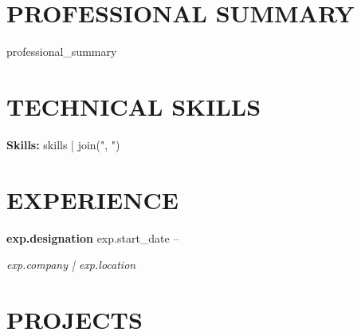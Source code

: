 \documentclass[11pt,a4paper]{article}
\begin{document}
{%

\section*{PROFESSIONAL SUMMARY}

\justifying

{{professional_summary}}

{%





{%

\section*{TECHNICAL SKILLS}

\justifying

\textbf{Skills: }{{skills | join(", ")}}


{%




{%

\section*{EXPERIENCE}

{%

\noindent
\textbf{ {{exp.designation}} } \hfill {{exp.start_date}} -- {%
\par
\textit{ {{exp.company}} | {{exp.location}} }


\par


{%

{%



{%

\section*{PROJECTS}

}}}}}}}}}}
\end{document}
